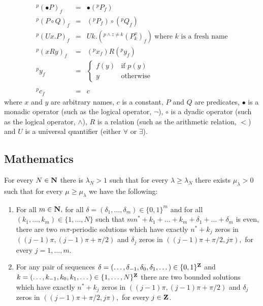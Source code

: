 \documentclass[twocolumn]{svjour3}          %
\begin{document}
\begin{eqnarray}
{}^{p}\left(\bullet P\right)_{f} & = & \bullet \left(
{}^{p}P_{f}\right) \nonumber \\
{}^{p}\left(P \circ Q\right)_{f} & =
& \left({}^{p}P_{f}\right) \circ \left({}^{p}Q_{f}\right) \nonumber \\
{}^{p}\left(Ux.P\right)_{f} & = &Uk.\left( {}^{p \wedge z \neq k}\left(P^{x}_{k}\right)_{f}\right)
\ \mbox{where $k$ is a fresh name}
\nonumber \\
{}^{p}\left(x R y\right)_{f} & = & \left({}^{p}x_{f}\right) R
\left({}^{p}y_{f}\right) \nonumber \\
{}^{p}y_{f} & = & \left\{ \begin{array}{ll}
f\left(y\right) & \mbox{if $p\left(y\right) $} \nonumber \\
y & \mbox{otherwise}
\end{array} \right . \\[-4mm] \\
\nonumber{}^{p}c_{f} & = & c
\end{eqnarray}
where $x$ and $y$ are arbitrary names, $c$ is a constant, $P$ and
$Q$ are predicates, $\bullet$ is a monadic operator (such as the
logical operator, $\neg$), $\circ$ is a dyadic operator (such as
the logical operator, $\wedge$), $R$ is a relation (such as the
arithmetic relation, $<$) and $U$
is a universal quantifier (either $\forall$ or $\exists$).

\subsection{Mathematics}

For every $N\in {\bf N}$ there is ${\lambda}_N>1$ such that for
every ${\lambda}\geq {\lambda}_N$ there exists $\mu_{\lambda}>0$
such that for every $\mu\geq \mu_{\lambda}$ we have the following:
\begin{enumerate}
\item
For all $m\in{\bf N},$ for all
$\delta=(\delta_1,\dots,\delta_m)\in\{0,1\}^m$ and for all
$(k_1,\dots,k_m)\in\{1,\dots,N\}$ such that
$mn^*+k_1+\dots+k_m+\delta_1+\dots+\delta_m$ is even, there are
two $m\pi$-periodic solutions which have exactly $n^*+k_j$ zeros
in $((j-1)\pi,(j-1)\pi+\pi/2)$ and $\delta_j$ zeros in
$((j-1)\pi+\pi/2,j\pi),$ for every $j=1,\dots,m$.
\item
For any pair of sequences
$\delta=(\dots,\delta_{-1},\delta_0,\delta_1,\dots)\in\{0,1\}^{\bf
Z}$ and $k=(\dots,k_{-1},\allowbreak k_0,k_1,\dots)\in\{1,\dots,N\}^{\bf
Z}$ there are two bounded solutions  which have exactly $n^*+k_j$
zeros in $((j-1)\pi,(j-1)\pi+\pi/2)$ and $\delta_j$ zeros in
$((j-1)\pi+\pi/2,j\pi),$ for every $j\in{\bf Z}$.
\end{enumerate}
\end{document}
